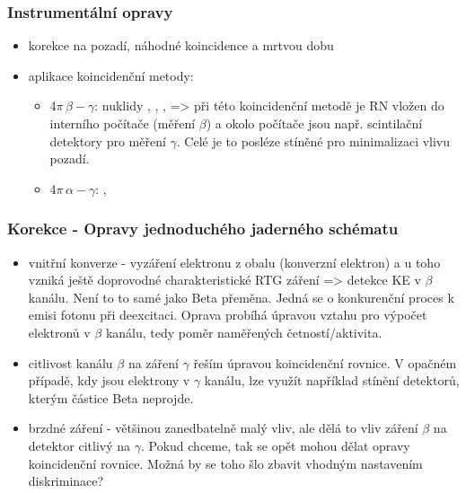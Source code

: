 \subsubsection{Instrumentální opravy}

\begin{itemize}
    \item korekce na pozadí, náhodné koincidence a mrtvou dobu 


    \item aplikace koincidenční metody: 
    \begin{itemize}
        \item 4$\pi \, \beta - \gamma$: nuklidy , , ,  => při této koincidenční metodě je RN vložen do interního počítače (měření $\beta$) a okolo počítače jsou např. scintilační detektory pro měření $\gamma$. Celé je to posléze stíněné pro minimalizaci vlivu pozadí.
        
        \item 4$\pi \, \alpha - \gamma$: , 

        
    \end{itemize}
\end{itemize}
\subsubsection{Korekce - Opravy jednoduchého jaderného schématu}
\begin{itemize}
    \item vnitřní konverze - vyzáření elektronu z obalu (konverzní elektron) a u toho vzniká ještě doprovodné charakteristické RTG záření => detekce KE v $\beta $ kanálu. Není to to samé jako Beta přeměna. Jedná se o konkurenční proces k emisi fotonu při deexcitaci. Oprava probíhá úpravou vztahu pro výpočet elektronů v $\beta$ kanálu, tedy poměr naměřených četností/aktivita. 
    \item citlivost kanálu $\beta$ na záření $\gamma$ řeším úpravou koincidenční rovnice. V opačném případě, kdy jsou elektrony v $\gamma$ kanálu, lze využít například stínění detektorů, kterým částice Beta neprojde.
    \item brzdné záření - většinou zanedbatelně malý vliv, ale dělá to vliv záření $\beta$ na detektor citlivý na $\gamma$. Pokud chceme, tak se opět mohou dělat opravy koincidenční rovnice. Možná by se toho šlo zbavit vhodným nastavením diskriminace?
    
\end{itemize}

